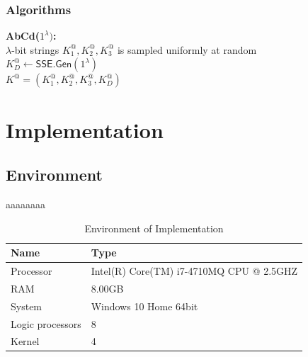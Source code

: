 \documentclass[a4paper,12pt,UTF8]{ctexart}
\begin{document}
\begin{spacing}{1.1}
\subsubsection{Algorithms}
\begin{framed}
\noindent\textbf{\textsf{AbCd}($1^\lambda)$:}
\\\indent $\lambda$-bit strings $K_1^@,K_2^@,K_3^@$ is sampled uniformly at random
\\\indent $K^@_D\leftarrow\textsf{SSE.Gen}(1^\lambda)$
\\\indent $K^@=(K_1^@,K_2^@,K_3^@,K^@_D)$
\end{framed}

\clearpage
\section{Implementation}
\setcounter{table}{0}
\setcounter{figure}{0}
\subsection{Environment}
aaaaaaaa
\begin{table}[h] %
    \setlength{\abovecaptionskip}{0pt}%
    \setlength{\belowcaptionskip}{4pt}%
	\begin{center}	\centering
		\caption{\label{environment}Environment of Implementation} 
		\begin{tabular}[c]{ll} 
			\toprule 
			Name & Type \\
			\midrule 
        	Processor & Intel(R) Core(TM) i7-4710MQ CPU @ 2.5GHZ \\
        	RAM & 8.00GB \\
 			System &  Windows 10 Home 64bit \\
			Logic processors & 8\\
			Kernel & 4 \\
			\bottomrule 
\end{tabular} 
\end{center}
\end{table}

\end{spacing}
\end{document}
